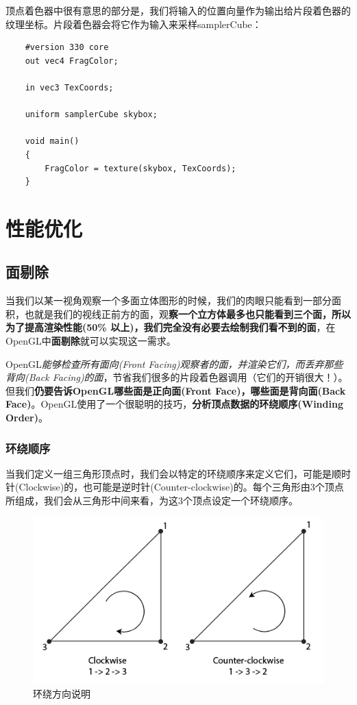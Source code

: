 \documentclass[UTF8,a4paper,12pt]{ctexbook}
\begin{document}
			顶点着色器中很有意思的部分是，我们将输入的位置向量作为输出给片段着色器的纹理坐标。片段着色器会将它作为输入来采样samplerCube：
			\begin{lstlisting}
	#version 330 core
	out vec4 FragColor;
	
	in vec3 TexCoords;
	
	uniform samplerCube skybox;
	
	void main()
	{    
	    FragColor = texture(skybox, TexCoords);
	}				
			\end{lstlisting}

\chapter{性能优化}	
	\section{面剔除}
		当我们以某一视角观察一个多面立体图形的时候，我们的肉眼只能看到一部分面积，也就是我们的视线正前方的面，观\textbf{察一个立方体最多也只能看到三个面，所以为了提高渲染性能(50\% 以上)，我们完全没有必要去绘制我们看不到的面}，在OpenGL中\textbf{面剔除}就可以实现这一需求。
		
		OpenGL\textit{能够检查所有面向(Front Facing)观察者的面，并渲染它们，而丢弃那些背向(Back Facing)的面}，节省我们很多的片段着色器调用（它们的开销很大！）。但我们\textbf{仍要告诉OpenGL哪些面是正向面(Front Face)，哪些面是背向面(Back Face)}。OpenGL使用了一个很聪明的技巧，\textbf{分析顶点数据的环绕顺序(Winding Order)}。
		
		\subsection{环绕顺序}
			当我们定义一组三角形顶点时，我们会以特定的环绕顺序来定义它们，可能是顺时针(Clockwise)的，也可能是逆时针(Counter-clockwise)的。每个三角形由3个顶点所组成，我们会从三角形中间来看，为这3个顶点设定一个环绕顺序。
			
			\begin{figure}[H]
				\centering
				\includegraphics[width=.9\linewidth]{faceculling_windingorder}
				\caption{环绕方向说明}
			\end{figure}
			
\end{document}
